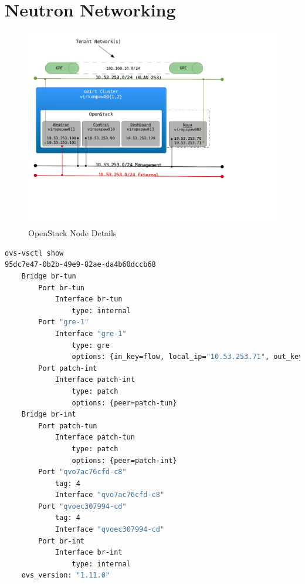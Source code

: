 \documentclass[11pt,letterpaper,oneside]{book}
\begin{document}
\section{Neutron Networking}
\begin{figure}[ht]
	\caption{OpenStack Node Details}
	\centering
	\label{fig:openstack_neutron_gre}
	\includegraphics[scale=0.75]{./pictures/openstack_neutron_gre.png}
\end{figure}
\begin{lstlisting}[caption={Nova Node Open vSwtich},language=bash]
ovs-vsctl show
95dc7e47-0b2b-49e9-82ae-da4b60dccb68
    Bridge br-tun
        Port br-tun
            Interface br-tun
                type: internal
        Port "gre-1"
            Interface "gre-1"
                type: gre
                options: {in_key=flow, local_ip="10.53.253.71", out_key=flow, remote_ip="10.53.253.101"}
        Port patch-int
            Interface patch-int
                type: patch
                options: {peer=patch-tun}
    Bridge br-int
        Port patch-tun
            Interface patch-tun
                type: patch
                options: {peer=patch-int}
        Port "qvo7ac76cfd-c8"
            tag: 4
            Interface "qvo7ac76cfd-c8"
        Port "qvoec307994-cd"
            tag: 4
            Interface "qvoec307994-cd"
        Port br-int
            Interface br-int
                type: internal
    ovs_version: "1.11.0"
\end{lstlisting}
\end{document}
